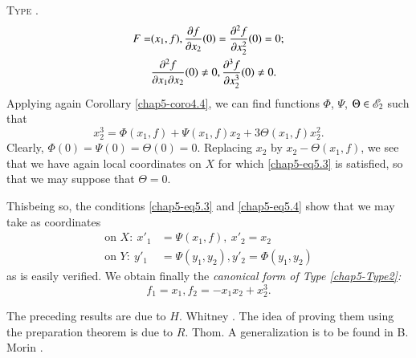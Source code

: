 \smallskip
\textsc{Type \label{chap5-Type2}}.
\begin{align}
F=& (x_{1},f), \dfrac{\partial f}{\partial x_{2}}(0)=\dfrac{\partial^{2}f}{\partial x^{2}_{2}}(0)=0;\label{chap5-eq5.3}\\
&\dfrac{\partial^{2}f}{\partial x_{1}\partial x_{2}}(0)\neq 0, \dfrac{\partial^{3}f}{\partial x^{3}_{2}}(0)\neq 0.\notag
\end{align}
Applying again Corollary \ref{chap5-coro4.4}, we can find functions $\Phi$, $\Psi$, $\Theta\in \mathscr{E}_{2}$ such that
\begin{equation}
x^{3}_{2}=\Phi(x_{1},f)+\Psi(x_{1},f)x_{2}+3\Theta (x_{1},f)x^{2}_{2}.\label{chap5-eq5.4}
\end{equation}
Clearly, $\Phi(0)=\Psi(0)=\Theta(0)=0$. Replacing $x_{2}$ by $x_{2}-\Theta(x_{1},f)$, we see that we have again local coordinates on $X$ for which \eqref{chap5-eq5.3} is satisfied, so that we may suppose that $\Theta=0$.

This\pageoriginale being so, the conditions \eqref{chap5-eq5.3} and \eqref{chap5-eq5.4} show that we may take as coordinates
\begin{align*}
\text{on } X: \ x'_{1} &= \Psi(x_{1},f), \ x'_{2}=x_{2}\\
\text{on } Y: \ y'_{1} &= \Psi(y_{1},y_{2}), y'_{2}=\Phi(y_{1},y_{2})
\end{align*}
as is easily verified. We obtain finally the {\em canonical form of Type \ref{chap5-Type2}:}
$$
f_{1}=x_{1}, f_{2}=-x_{1}x_{2}+x^{3}_{2}.
$$

The preceding results are due to $H$. Whitney \cite{H. Whitney : 3}. The idea of proving them using the preparation theorem is due to $R$. Thom. A generalization is to be found in B. Morin \cite{B. Morin : 1}.
